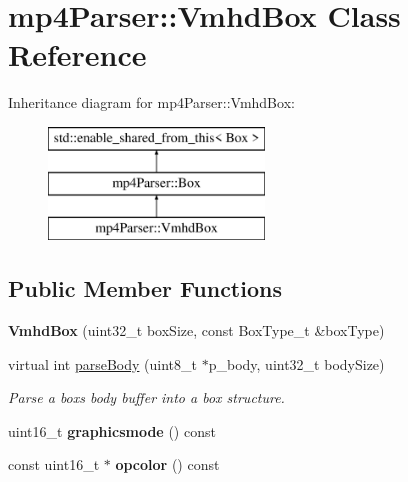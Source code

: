 \hypertarget{classmp4_parser_1_1_vmhd_box}{}\section{mp4\+Parser\+::Vmhd\+Box Class Reference}
\label{classmp4_parser_1_1_vmhd_box}
Inheritance diagram for mp4\+Parser\+::Vmhd\+Box\+:\begin{figure}[H]
\begin{center}
\leavevmode
\includegraphics[height=3.000000cm]{classmp4_parser_1_1_vmhd_box}
\end{center}
\end{figure}
\subsection*{Public Member Functions}
\begin{DoxyCompactItemize}
\item 
\mbox{\label{classmp4_parser_1_1_vmhd_box_ad3a4f0f87d7bdf5eb711174fa908abf6}} 
{\bfseries Vmhd\+Box} (uint32\+\_\+t box\+Size, const Box\+Type\+\_\+t \&box\+Type)
\item 
virtual int \mbox{\hyperlink{classmp4_parser_1_1_vmhd_box_a3dbd2d4c86f22a16fe0e345fecad8fcb}{parse\+Body}} (uint8\+\_\+t $\ast$p\+\_\+body, uint32\+\_\+t body\+Size)
\begin{DoxyCompactList}\small\item\em Parse a box\textquotesingle{}s body buffer into a box structure. \end{DoxyCompactList}\item 
\mbox{\label{classmp4_parser_1_1_vmhd_box_a9d2ecff86203b51f17ded7807dfd7569}} 
uint16\+\_\+t {\bfseries graphicsmode} () const
\item 
\mbox{\label{classmp4_parser_1_1_vmhd_box_adc7b839345933f6f8c7d149110d657a8}} 
const uint16\+\_\+t $\ast$ {\bfseries opcolor} () const
\end{DoxyCompactItemize}
